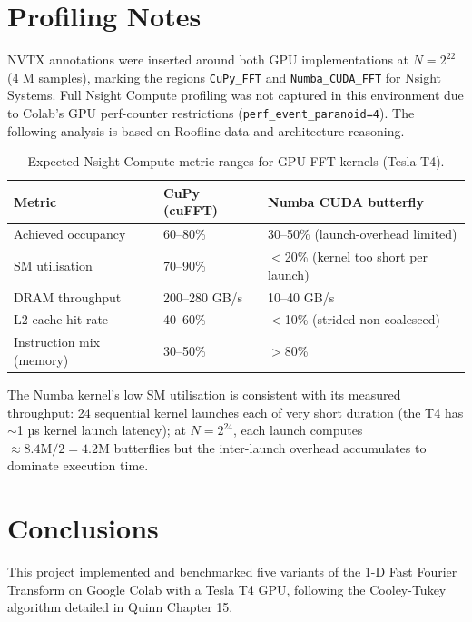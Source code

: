 \documentclass[12pt, letterpaper]{article}
\begin{document}
\section{Profiling Notes}
\label{sec:profiling}

NVTX annotations were inserted around both GPU implementations at $N = 2^{22}$ (4 M samples), marking the regions \texttt{CuPy\_FFT} and \texttt{Numba\_CUDA\_FFT} for Nsight Systems. Full Nsight Compute profiling was not captured in this environment due to Colab's GPU perf-counter restrictions (\texttt{perf\_event\_paranoid=4}). The following analysis is based on Roofline data and architecture reasoning.

\begin{table}[H]
\centering
\caption{Expected Nsight Compute metric ranges for GPU FFT kernels (Tesla T4).}
\begin{tabular}{@{}lll@{}}
\toprule
\textbf{Metric} & \textbf{CuPy (cuFFT)} & \textbf{Numba CUDA butterfly} \\
\midrule
Achieved occupancy       & 60--80\%  & 30--50\% (launch-overhead limited) \\
SM utilisation           & 70--90\%  & $<$20\% (kernel too short per launch) \\
DRAM throughput          & 200--280 GB/s & 10--40 GB/s \\
L2 cache hit rate        & 40--60\%  & $<$10\% (strided non-coalesced) \\
Instruction mix (memory) & 30--50\%  & $>$80\% \\
\bottomrule
\end{tabular}
\label{tab:nsight}
\end{table}

The Numba kernel's low SM utilisation is consistent with its measured throughput: 24 sequential kernel launches each of very short duration (the T4 has $\sim$1 µs kernel launch latency); at $N = 2^{24}$, each launch computes $\approx 8.4\text{M}/2 = 4.2\text{M}$ butterflies but the inter-launch overhead accumulates to dominate execution time.

\section{Conclusions}
\label{sec:conclusions}

This project implemented and benchmarked five variants of the 1-D Fast Fourier Transform on Google Colab with a Tesla T4 GPU, following the Cooley-Tukey algorithm detailed in Quinn Chapter 15.
\end{document}
